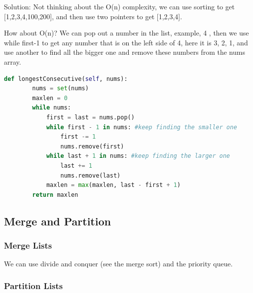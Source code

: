 \documentclass[../specific-algorithms.tex]{subfiles}
\begin{document}
Solution: Not thinking about the O(n) complexity, we can use sorting to get [1,2,3,4,100,200], and then use two pointers to get [1,2,3,4].

How about O(n)? We can pop out a number in the list, example, 4 , then we use while first-1 to get any number that is on the left side of 4, here it is 3, 2, 1, and use another to find all the bigger one and remove these numbers from the nums array.
\begin{lstlisting}[language =Python]
def longestConsecutive(self, nums):
        nums = set(nums)
        maxlen = 0
        while nums:
            first = last = nums.pop()
            while first - 1 in nums: #keep finding the smaller one
                first -= 1
                nums.remove(first)
            while last + 1 in nums: #keep finding the larger one
                last += 1
                nums.remove(last)
            maxlen = max(maxlen, last - first + 1)
        return maxlen
\end{lstlisting}


\subsection{Merge and Partition}
\subsubsection{Merge Lists}
We can use divide and conquer (see the merge sort) and the priority queue.
\subsubsection{Partition Lists}
\end{document}
